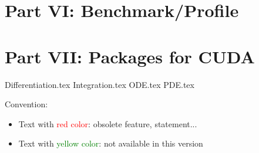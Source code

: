 \documentclass[11pt]{book}
\begin{document}
\part{Part VI: Benchmark/Profile}







\part{Part VII: Packages for CUDA}
{Differentiation.tex}
{Integration.tex}
{ODE.tex}
{PDE.tex}












% 
% 
% 
% 

%
%
Convention:

\begin{itemize}
\item Text with \textcolor{red}{red color}: obsolete feature,
  statement...
\item Text with \textcolor{green}{yellow color}: not available in this version
\end{itemize}
\backmatter 
%
%
\printindex %
\end{document}

